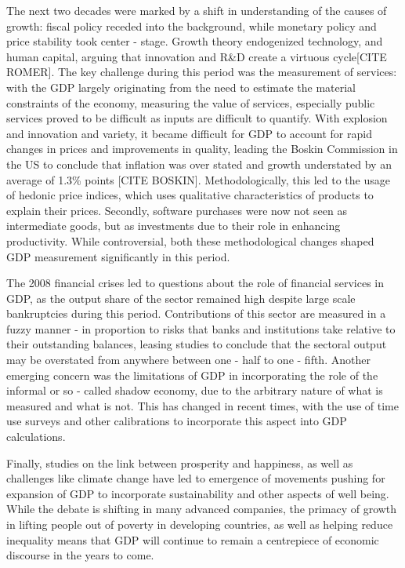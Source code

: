 \documentclass[12pt,nobind, a4paper]{reedthesis}
\begin{document}
 The next two decades were marked by a shift in understanding of the causes of growth: fiscal policy receded into the background, while monetary policy and price stability took center - stage. Growth theory endogenized technology, and human capital, arguing that innovation and R\&D create a virtuous cycle{[}CITE ROMER{]}. The key challenge during this period was the measurement of services: with the GDP largely originating from the need to estimate the material constraints of the economy, measuring the value of services, especially public services proved to be difficult as inputs are difficult to quantify. With explosion and innovation and variety, it became difficult for GDP to account for rapid changes in prices and improvements in quality, leading the Boskin Commission in the US to conclude that inflation was over stated and growth understated by an average of 1.3\% points {[}CITE BOSKIN{]}. Methodologically, this led to the usage of hedonic price indices, which uses qualitative characteristics of products to explain their prices. Secondly, software purchases were now not seen as intermediate goods, but as investments due to their role in enhancing productivity. While controversial, both these methodological changes shaped GDP measurement significantly in this period.
 \linebreak

 The 2008 financial crises led to questions about the role of financial services in GDP, as the output share of the sector remained high despite large scale bankruptcies during this period. Contributions of this sector are measured in a fuzzy manner - in proportion to risks that banks and institutions take relative to their outstanding balances, leasing studies to conclude that the sectoral output may be overstated from anywhere between one - half to one - fifth. Another emerging concern was the limitations of GDP in incorporating the role of the informal or so - called shadow economy, due to the arbitrary nature of what is measured and what is not. This has changed in recent times, with the use of time use surveys and other calibrations to incorporate this aspect into GDP calculations.
 \linebreak

 Finally, studies on the link between prosperity and happiness, as well as challenges like climate change have led to emergence of movements pushing for expansion of GDP to incorporate sustainability and other aspects of well being. While the debate is shifting in many advanced companies, the primacy of growth in lifting people out of poverty in developing countries, as well as helping reduce inequality means that GDP will continue to remain a centrepiece of economic discourse in the years to come.
\end{document}
